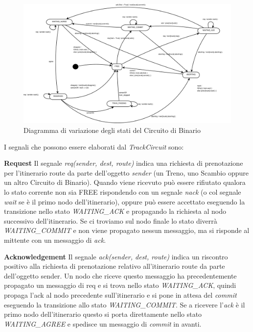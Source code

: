 \begin{figure}

\centering
\includegraphics[width=24cm]{imgs/TrackCircuit.pdf}

\caption{Diagramma di variazione degli stati del Circuito
di Binario}\label{fig:Circuito}

\end{figure}



I segnali che possono essere elaborati dal \textit{TrackCircuit} sono:

\textbf{Request} Il segnale \textit{req(sender, dest, route)} indica una
richiesta di prenotazione per l’itinerario route da parte dell’oggetto
\textit{sender} (un Treno, uno Scambio oppure un altro Circuito di Binario).
Quando viene ricevuto può essere rifiutato qualora lo stato corrente non sia
FREE rispondendo con un segnale \textit{nack} (o col segnale \textit{wait} se è
il primo nodo dell’itinerario), oppure può essere accettato
eseguendo la transizione nello stato \textit{WAITING\_ACK} e propagando la
richiesta al nodo successivo dell’itinerario. Se ci troviamo sul nodo finale lo
stato diverrà \textit{WAITING\_COMMIT} e non viene propagato nessun messaggio,
ma si risponde al mittente con un messaggio di \textit{ack}.


\textbf{Acknowledgement} Il segnale \textit{ack(sender, dest, route)} indica un
riscontro positivo alla richiesta di prenotazione relativo all’itinerario route da parte
dell’oggetto sender. Un nodo che riceve questo messaggio ha precedentemente
propagato un messaggio di req e si trova nello stato \textit{WAITING\_ACK},
quindi propaga l’ack al nodo precedente sull’itinerario e si pone in attesa del
\textit{commit} eseguendo la transizione allo stato \textit{WAITING\_COMMIT}. Se
a ricevere l’\textit{ack} è il primo nodo dell’itinerario questo si porta
direttamente nello stato \textit{WAITING\_AGREE} e spedisce un messaggio di
\textit{commit} in avanti.

